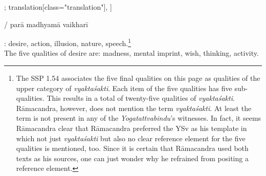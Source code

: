 \begin{alignment}[
  texts=edition[class="edition"];
  translation[class="translation"],
  ]
\begin{edition}
\begin{prose}[p52_01]
/
parā\dd{}
\dd{}
madhyamā\dd{}
vaikharī\dd{}
\dd{}
\end{prose}
  \end{edition}
  \begin{translation}
                   \begin{tlate}[p52_01]
                     \noindent
{}: desire, action, illusion, nature, speech.\footnote{The SSP 1.54 associates the five final qualities on this page as qualities of the upper category of \textit{vyaktaśakti}. Each item of the five qualities has five sub-qualities. This results in a total of twenty-five qualities of \textit{vyaktaśakti}. Rāmacandra, however, does not mention the term \textit{vyaktaśakti}. At least the term is not present in any of the \textit{Yogatattvabindu}'s witnesses. In fact, it seems Rāmacandra clear that Rāmacandra preferred the YSv as his template in which not just \textit{vyaktaśakti} but also no clear reference element for the five qualities is mentioned, too. Since it is certain that Rāmacandra used both texts as his sources, one can just wonder why he refrained from positing a reference element.}\\
      
The five qualities of desire are: madness, mental imprint, wish, thinking, activity.\\


\end{tlate}
\end{translation}
\end{alignment}
